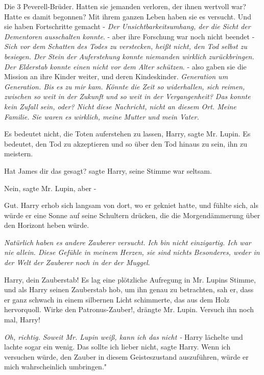 Die 3 Peverell-Brüder. Hatten sie jemanden verloren, der ihnen wertvoll war?
Hatte es damit begonnen? \glqq Mit ihrem ganzen Leben haben sie es versucht. Und
sie haben Fortschritte gemacht -\grqq{} \emph{Der Unsichtbarkeitsumhang, der die
Sicht der Dementoren ausschalten konnte}. \glqq - aber ihre Forschung war noch
nicht beendet -\grqq{} \emph{Sich vor dem Schatten des Todes zu verstecken,
heißt nicht, den Tod selbst zu besiegen. Der Stein der Auferstehung konnte
niemanden wirklich zurückbringen. Der Elderstab konnte einen nicht vor dem Alter
schützen}. \glqq - also gaben sie die Mission an ihre Kinder weiter, und deren
Kindeskinder.\grqq{} \emph{Generation um Generation. Bis es zu mir kam. Könnte
die Zeit so widerhallen, sich reimen, zwischen so weit in der Zukunft und so
weit in der Vergangenheit? Das konnte kein Zufall sein, oder? Nicht diese
Nachricht, nicht an diesem Ort. Meine Familie. Sie waren es wirklich, meine
Mutter und mein Vater. }

\glqq Es bedeutet nicht, die Toten auferstehen zu lassen, Harry\grqq{}, sagte
Mr. Lupin. \glqq Es bedeutet, den Tod zu akzeptieren und so über den Tod hinaus
zu sein, ihn zu meistern.\grqq{}

\glqq Hat James dir das gesagt?\grqq{} sagte Harry, seine Stimme war seltsam.

\glqq Nein\grqq{}, sagte Mr. Lupin, \glqq aber -\grqq{}

\glqq Gut.\grqq{} Harry erhob sich langsam von dort, wo er gekniet hatte, und
fühlte sich, als würde er eine Sonne auf seine Schultern drücken, die die
Morgendämmerung über den Horizont heben würde.

\emph{Natürlich haben es andere Zauberer versucht. Ich bin nicht einzigartig.
Ich war nie allein. Diese Gefühle in meinem Herzen, sie sind nichts Besonderes,
weder in der Welt der Zauberer noch in der der Muggel}.

\glqq Harry, dein Zauberstab!\grqq{} Es lag eine plötzliche Aufregung in Mr.
Lupins Stimme, und als Harry seinen Zauberstab hob, um ihn genau zu betrachten,
sah er, dass er ganz schwach in einem silbernen Licht schimmerte, das aus dem
Holz hervorquoll. \glqq Wirke den Patronus-Zauber!\grqq{}, drängte Mr. Lupin.
\glqq Versuch ihn noch mal, Harry!\grqq{}

\emph{Oh, richtig. Soweit Mr. Lupin weiß, kann ich das nicht - }
Harry lächelte und lachte sogar ein wenig. \glqq Das sollte ich lieber
nicht\grqq{}, sagte Harry. \glqq Wenn ich versuchen würde, den Zauber in diesem
Geisteszustand auszuführen, würde er mich wahrscheinlich umbringen."


